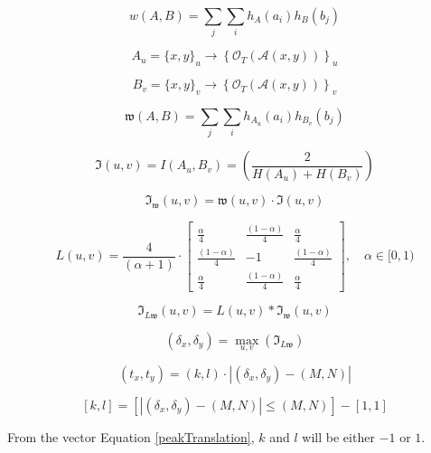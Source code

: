 \begin{equation}
\label{}
w(A,B)=\sum_{j}\sum_{i}{h_{A}(a_{i})h_{B}(b_{j})}
\end{equation}


\begin{equation}
\label{}
A_{u}=\{x,y\}_{u} \rightarrow \left\{ \mathcal{O}_{T}\left(\mathcal{A}(x,y) \right) \right\}_{u} 
\end{equation}


\begin{equation}
\label{}
B_{v}=\{x,y\}_{v} \rightarrow \left\{ \mathcal{O}_{T}\left(\mathcal{A}(x,y) \right) \right\}_{v}
\end{equation}


\begin{equation}
\label{}
\mathfrak{w}(A,B)=\sum_{j}\sum_{i}{h_{A_{u}}(a_{i})h_{B_{v}}(b_{j})}
\end{equation}

\begin{equation}
\label{}
\mathfrak{I}(u,v)=I(A_{u},B_{v})=\left(\frac{2}{H(A_{u})+H(B_{v})}\right)
\end{equation}


\begin{equation}
\label{WeightedInformation}
	\mathfrak{I}_{\mathfrak{w}}(u,v)=\mathfrak{w}(u,v) \cdot \mathfrak{I}(u,v)
\end{equation}


\begin{equation}
\label{laplacianFilter}
	L(u,v)=\frac{4}{(\alpha + 1)} \cdot
	\begin{bmatrix}
		\frac{\alpha}{4} & \frac{(1-\alpha)}{4} & \frac{\alpha}{4} \\
		\frac{(1-\alpha)}{4} & -1 & \frac{(1-\alpha)}{4} \\
		\frac{\alpha}{4} & \frac{(1-\alpha)}{4} & \frac{\alpha}{4}
	\end{bmatrix}, \quad \alpha \in [0,1)
\end{equation}

\begin{equation}
\label{FilteredWeightedInformation}
	\mathfrak{I}_{L\mathfrak{w}}(u,v)=L(u,v) \ast \mathfrak{I}_{\mathfrak{w}}(u,v)
\end{equation}

\begin{equation}
\label{peakLocation}
	(\delta_{x},\delta_{y})=\max_{u,v}\left(\mathfrak{I}_{L\mathfrak{w}}\right)
\end{equation}

\begin{equation}
\label{peakTranslation}
	(t_{x},t_{y})=(k,l) \cdot \left| (\delta_{x},\delta_{y}) - (M,N) \right|
\end{equation}

\begin{equation}
\label{peakTranslation}
	[k,l] = \left[ \left| (\delta_{x},\delta_{y}) - (M,N) \right| \le (M,N) \right] - [1,1]
\end{equation}

From the vector Equation \ref{peakTranslation}, $k$ and $l$ will be either $-1$ or $1$.



